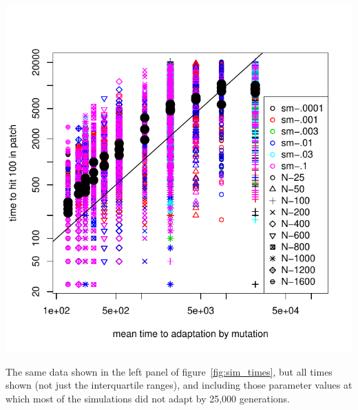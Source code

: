 \documentclass{article}
\begin{document}






\begin{sfigure}
  \begin{center}
    \includegraphics{mutation-times-predicted}
  \end{center}
  \caption{
    The same data shown in the left panel of figure~\ref{fig:sim_times},
    but all times shown (not just the interquartile ranges),
    and including those parameter values at which most of the simulations did not adapt by 25,000 generations.
  } \label{sfig:sim_migration_times}
\end{sfigure}
\end{document}
